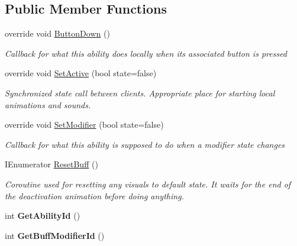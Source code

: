 \subsection*{Public Member Functions}
\begin{DoxyCompactItemize}
\item 
override void \hyperlink{class_multi_boomerang_buff_ae7f8d7ceb8511f4a0c4af037f7f126ef}{Button\+Down} ()
\begin{DoxyCompactList}\small\item\em Callback for what this ability does locally when its associated button is pressed \end{DoxyCompactList}\item 
override void \hyperlink{class_multi_boomerang_buff_a40111507e750be94b8f48acd57878d60}{Set\+Active} (bool state=false)
\begin{DoxyCompactList}\small\item\em Synchronized state call between clients. Appropriate place for starting local animations and sounds. \end{DoxyCompactList}\item 
override void \hyperlink{class_multi_boomerang_buff_a0c48dc1b79b214c087a53c2114b18c50}{Set\+Modifier} (bool state=false)
\begin{DoxyCompactList}\small\item\em Callback for what this ability is supposed to do when a modifier state changes \end{DoxyCompactList}\item 
I\+Enumerator \hyperlink{class_multi_boomerang_buff_aee200dc6740f74b977090e63cd0c44da}{Reset\+Buff} ()
\begin{DoxyCompactList}\small\item\em Coroutine used for resetting any visuals to default state. It waits for the end of the deactivation animation before doing anything. \end{DoxyCompactList}\item 
\hypertarget{class_multi_boomerang_buff_a9150ccf13ce98e195ad53690b25830cf}{}\label{class_multi_boomerang_buff_a9150ccf13ce98e195ad53690b25830cf} 
int {\bfseries Get\+Ability\+Id} ()
\item 
\hypertarget{class_multi_boomerang_buff_a4e57a1d56ef1bcd2c1d525eb7415da32}{}\label{class_multi_boomerang_buff_a4e57a1d56ef1bcd2c1d525eb7415da32} 
int {\bfseries Get\+Buff\+Modifier\+Id} ()
\end{DoxyCompactItemize}
